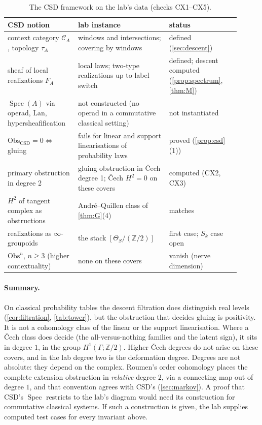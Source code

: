 \documentclass[11pt]{article}
\theoremstyle{definition}\newtheorem{definition}{Definition}\newtheorem{remark}{Remark}
\begin{document}
\begin{table}[!htbp]\centering\small
\begin{tabular}{p{0.27\linewidth}p{0.36\linewidth}p{0.28\linewidth}}\toprule
CSD notion & lab instance & status\\\midrule
context category $\mathcal C_A$, topology $\tau_A$ & windows and intersections; covering by windows & defined (\cref{sec:descent})\\
sheaf of local realizations $F_A$ & local laws; two-type realizations up to label switch & defined; descent computed (\cref{prop:spectrum}, \cref{thm:M})\\
$\operatorname{Spec}(A)$ via operad, $\mathrm{Lan}$, hypersheafification & not constructed (no operad in a commutative classical setting) & not instantiated\\
$\mathrm{Obs}_{\mathrm{CSD}}=0\iff$ gluing & fails for linear and support linearisations of probability laws & proved (\cref{prop:csd}(1))\\
primary obstruction in degree 2 & gluing obstruction in Čech degree 1; Čech $H^2=0$ on these covers & computed (CX2, CX3)\\
$H^2$ of tangent complex as obstructions & André--Quillen class of \cref{thm:G}(4) & matches\\
realizations as $\infty$-groupoids & the stack $[\Theta_S/(\mathbb Z/2)]$ & first case; $S_k$ case open\\
$\mathrm{Obs}^n$, $n\ge3$ (higher contextuality) & none on these covers & vanish (nerve dimension)\\\bottomrule
\end{tabular}
\caption{The CSD framework on the lab's data (checks CX1--CX5).}\label{tab:csd}
\end{table}

\paragraph{Summary.} On classical probability tables the descent filtration does distinguish real levels (\cref{cor:filtration}, \cref{tab:tower}), but the
obstruction that decides gluing is positivity. It is not a cohomology class of the linear or the support linearisation. Where a Čech class
does decide (the all-versus-nothing families and the latent sign), it sits in degree $1$, in the group $H^1(\Gamma;\mathbb Z/2)$.
Higher Čech degrees do not arise on these covers, and in the lab degree two is the deformation degree. Degrees are not absolute: they
depend on the complex. Roumen's order cohomology places the complete extension obstruction in \emph{relative} degree $2$, via a
connecting map out of degree $1$, and that convention agrees with CSD's (\cref{sec:markov}). A proof that CSD's $\operatorname{Spec}$ restricts to
the lab's diagram would need its construction for commutative classical systems. If such a construction is given, the lab supplies
computed test cases for every invariant above.
\end{document}
